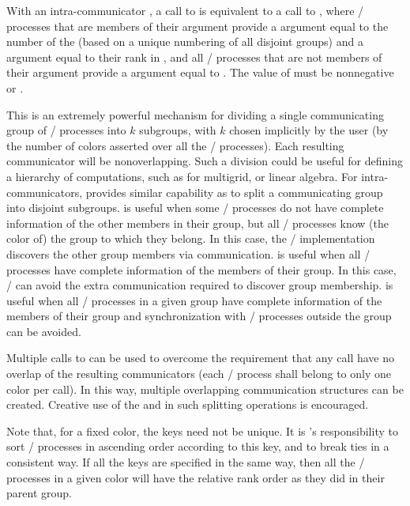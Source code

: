 With an intra-communicator , a call to  is
equivalent to a call to , where \MPI/ processes
that are members of their  argument provide
a  argument equal to the number of the 
(based on a unique numbering of all disjoint groups) and
a  argument equal to their rank in , and
all \MPI/ processes that are not members of their  argument provide
a  argument equal to .
The value of  must be
nonnegative or .

\begin{users}
This is an extremely powerful mechanism for dividing a single
communicating group of \MPI/ processes into $k$ subgroups, with $k$ chosen
implicitly by the user (by the number of
colors asserted over all the \MPI/ processes). Each resulting communicator will be
nonoverlapping. Such a division could be useful for defining a hierarchy
of computations, such as for multigrid, or linear algebra.
For intra-communicators,  provides similar capability as 
to split a communicating group into disjoint subgroups.  is useful
when some \MPI/ processes do not have complete information of the other members in their
group, but all \MPI/ processes know (the color of) the group to which they belong.
In this case, the \MPI/ implementation discovers the other group members via
communication.  is useful when all \MPI/ processes have complete
information of the members of their group. In this case, \MPI/ can avoid the extra
communication required to discover group membership.
 is useful when
all \MPI/ processes in a given group have complete information of the members of
their group and synchronization with \MPI/ processes outside the group can be
avoided.

Multiple calls to  can be used to overcome the
requirement that any call have no overlap of the resulting communicators (each
\MPI/ process shall belong to only one color per call). In this way, multiple overlapping
communication structures can be created. Creative use of the 
and  in such splitting operations is encouraged.

Note that, for a fixed color, the keys need not
be unique. It is 's responsibility to sort \MPI/ processes
in ascending order according to this key, and to break ties in a consistent
way. If all the keys are specified in the same way, then all the \MPI/ processes
in a given color will have the relative rank order as they did in their
parent group.

\end{users}

